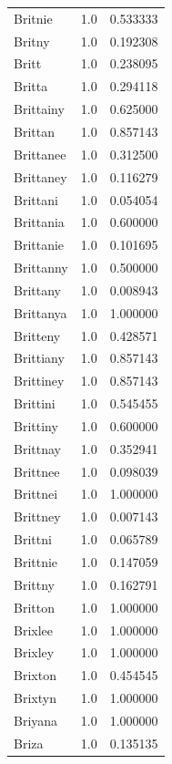 \documentclass[
  letterpaper,
  DIV=11,
  numbers=noendperiod]{scrreprt}
\begin{document}
\begin{tabular}{lrr}
Britnie         &   1.0 &   0.533333 \\
Britny          &   1.0 &   0.192308 \\
Britt           &   1.0 &   0.238095 \\
Britta          &   1.0 &   0.294118 \\
Brittainy       &   1.0 &   0.625000 \\
Brittan         &   1.0 &   0.857143 \\
Brittanee       &   1.0 &   0.312500 \\
Brittaney       &   1.0 &   0.116279 \\
Brittani        &   1.0 &   0.054054 \\
Brittania       &   1.0 &   0.600000 \\
Brittanie       &   1.0 &   0.101695 \\
Brittanny       &   1.0 &   0.500000 \\
Brittany        &   1.0 &   0.008943 \\
Brittanya       &   1.0 &   1.000000 \\
Britteny        &   1.0 &   0.428571 \\
Brittiany       &   1.0 &   0.857143 \\
Brittiney       &   1.0 &   0.857143 \\
Brittini        &   1.0 &   0.545455 \\
Brittiny        &   1.0 &   0.600000 \\
Brittnay        &   1.0 &   0.352941 \\
Brittnee        &   1.0 &   0.098039 \\
Brittnei        &   1.0 &   1.000000 \\
Brittney        &   1.0 &   0.007143 \\
Brittni         &   1.0 &   0.065789 \\
Brittnie        &   1.0 &   0.147059 \\
Brittny         &   1.0 &   0.162791 \\
Britton         &   1.0 &   1.000000 \\
Brixlee         &   1.0 &   1.000000 \\
Brixley         &   1.0 &   1.000000 \\
Brixton         &   1.0 &   0.454545 \\
Brixtyn         &   1.0 &   1.000000 \\
Briyana         &   1.0 &   1.000000 \\
Briza           &   1.0 &   0.135135 \\

\end{tabular}
\end{document}
